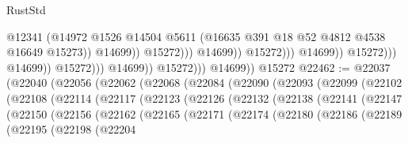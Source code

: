 \begin{lexlean}{RustStd}
\begin{coremodule}
                                                          @12341
                                                          (@14972
                                                            @1526
                                                            @14504
                                                            @5611
                                                            (@16635
                                                              @391
                                                              @18
                                                              @52
                                                              @4812
                                                              @4538
                                                              @16649
                                                              @15273))
                                                          @14699))
                                                      @15272)))
                                                @14699))
                                            @15272)))
                                      @14699))
                                  @15272)))
                            @14699))
                        @15272)))
                  @14699))
              @15272)))
        @14699))
    @15272
@22462 := @22037
    (@22040
      (@22056
        (@22062
          (@22068
            (@22084
              (@22090
                (@22093
                  (@22099
                    (@22102
                      (@22108
                        (@22114
                          (@22117
                            (@22123
                              (@22126
                                (@22132
                                  (@22138
                                    (@22141
                                      (@22147
                                        (@22150
                                          (@22156
                                            (@22162
                                              (@22165
                                                (@22171
                                                  (@22174
                                                    (@22180
                                                      (@22186
                                                        (@22189
                                                          (@22195
                                                            (@22198
                                                              (@22204

\end{coremodule}
\end{lexlean}
